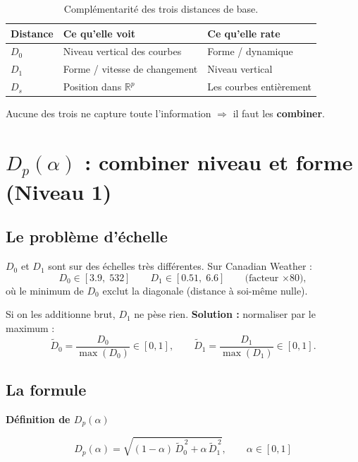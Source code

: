 \documentclass[11pt, a4paper]{article}
\newcommand{\R}{\mathbb{R}}
\newcommand{\Dp}{D_p}
\newenvironment{keybox}[1][]{%
  \def\FrameCommand{\fboxsep=8pt \fcolorbox{emphborder}{emphbox}}%
  \MakeFramed{\advance\hsize-\width \FrameRestore}%
  \noindent\textbf{#1}\par\smallskip\noindent\ignorespaces
}{\endMakeFramed}
\begin{document}
\begin{table}[H]
\centering
\begin{tabular}{lll}
  \toprule
  \textbf{Distance} & \textbf{Ce qu'elle voit} & \textbf{Ce qu'elle rate} \\
  \midrule
  $D_0$ & Niveau vertical des courbes & Forme / dynamique \\
  $D_1$ & Forme / vitesse de changement & Niveau vertical \\
  $D_s$ & Position dans $\R^p$ & Les courbes entièrement \\
  \bottomrule
\end{tabular}
\caption{Complémentarité des trois distances de base.}
\end{table}

Aucune des trois ne capture toute l'information $\Rightarrow$ il faut les
\textbf{combiner}.

\newpage
\section{$\Dp(\alpha)$ : combiner niveau et forme (Niveau 1)}

\subsection{Le problème d'échelle}

$D_0$ et $D_1$ sont sur des échelles très différentes. Sur Canadian Weather :
\[
  D_0 \in [3.9,\; 532] \qquad D_1 \in [0.51,\; 6.6] \qquad \text{(facteur $\times 80$)},
\]
où le minimum de $D_0$ exclut la diagonale (distance à soi-même nulle).

Si on les additionne brut, $D_1$ ne pèse rien. \textbf{Solution :}
normaliser par le maximum :
\[
  \tilde{D}_0 = \frac{D_0}{\max(D_0)} \in [0,1], \qquad
  \tilde{D}_1 = \frac{D_1}{\max(D_1)} \in [0,1].
\]

\subsection{La formule}

\begin{keybox}[Définition de $\Dp(\alpha)$]
\[
  \Dp(\alpha) = \sqrt{(1 - \alpha)\,\tilde{D}_0^{\,2}
  + \alpha\,\tilde{D}_1^{\,2}},
  \qquad \alpha \in [0, 1]
\]
\end{keybox}
\end{document}
